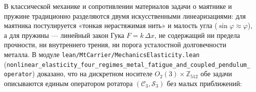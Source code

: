 В классической механике и сопротивлении материалов задачи о маятнике и пружине традиционно разделяются двумя искусственными линеаризациями: для маятника постулируется «тонкая нерастяжимая нить» и малость угла ($\sin\varphi \approx \varphi$), а для пружины --- линейный закон Гука $F = k\,\Delta x$, не содержащий ни предела прочности, ни внутреннего трения, ни порога усталостной долговечности металла. В модуле \texttt{lean/MtCarrier/MechanicsElasticity.lean} (\texttt{nonlinear\_\allowbreak elasticity\_\allowbreak four\_\allowbreak regimes\_\allowbreak metal\_\allowbreak fatigue\_\allowbreak and\_\allowbreak coupled\_\allowbreak pendulum\_\allowbreak operator}) доказано, что на дискретном носителе $O_2(3)\times\mathbb{Z}_{512}$ обе задачи описываются единым оператором ротатора $(\mathcal{C}_3, \mathcal{S}_3)$ без малых приближений:

